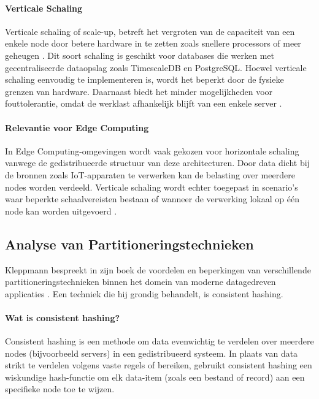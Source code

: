 \paragraph{Verticale Schaling}
Verticale schaling of scale-up, betreft het vergroten van de capaciteit van een enkele node door betere hardware in te zetten zoals snellere processors of meer geheugen \autocite{Ponnusamy2024}. 
Dit soort schaling is geschikt voor databases die werken met gecentraliseerde dataopslag zoals TimescaleDB en PostgreSQL. 
Hoewel verticale schaling eenvoudig te implementeren is, wordt het beperkt door de fysieke grenzen van hardware. 
Daarnaast biedt het minder mogelijkheden voor fouttolerantie, omdat de werklast afhankelijk blijft van een enkele server \autocite{Mahmud2020}.

\paragraph{Relevantie voor Edge Computing}
In Edge Computing-omgevingen wordt vaak gekozen voor horizontale schaling vanwege de gedistribueerde structuur van deze architecturen. 
Door data dicht bij de bronnen zoals IoT-apparaten te verwerken kan de belasting over meerdere nodes worden verdeeld. 
Verticale schaling wordt echter toegepast in scenario's waar beperkte schaalvereisten bestaan of wanneer de verwerking lokaal op één node kan worden uitgevoerd \autocite{Kleppmann2017}.


\subsection{Analyse van Partitioneringstechnieken}

Kleppmann bespreekt in zijn boek de voordelen en beperkingen van verschillende partitioneringstechnieken binnen het domein van moderne datagedreven applicaties \autocite{Kleppmann2017}.
Een techniek die hij grondig behandelt, is consistent hashing.

\paragraph{Wat is consistent hashing?}  
Consistent hashing is een methode om data evenwichtig te verdelen over meerdere nodes (bijvoorbeeld servers) in een gedistribueerd systeem. In plaats van data strikt te verdelen volgens vaste regels of bereiken, gebruikt consistent hashing een wiskundige hash-functie om elk data-item (zoals een bestand of record) aan een specifieke node toe te wijzen.  
 
